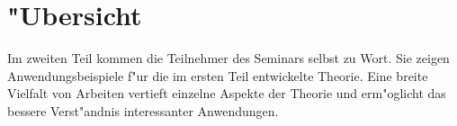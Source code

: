 %
%
%
\chapter*{"Ubersicht}
\rhead{}
\label{skript:uebersicht}
Im zweiten Teil kommen die Teilnehmer des Seminars selbst zu Wort.
Sie zeigen Anwendungsbeispiele f"ur die im ersten
Teil entwickelte Theorie.
Eine breite Vielfalt von Arbeiten vertieft einzelne Aspekte der Theorie
und erm"oglicht das bessere Verst"andnis interessanter Anwendungen.

